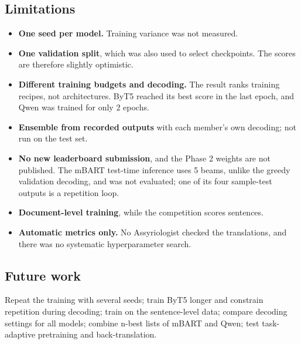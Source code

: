 \documentclass[a4paper,12pt]{article}
\begin{document}
\subsection{Limitations}
\begin{itemize}
    \item \textbf{One seed per model.} Training variance was not measured.
    \item \textbf{One validation split}, which was also used to select checkpoints. The scores are therefore slightly optimistic.
    \item \textbf{Different training budgets and decoding.} The result ranks training recipes, not architectures. ByT5 reached its best score in the last epoch, and Qwen was trained for only 2 epochs.
    \item \textbf{Ensemble from recorded outputs} with each member's own decoding; not run on the test set.
    \item \textbf{No new leaderboard submission}, and the Phase 2 weights are not published. The mBART test-time inference uses 5 beams, unlike the greedy validation decoding, and was not evaluated; one of its four sample-test outputs is a repetition loop.
    \item \textbf{Document-level training}, while the competition scores sentences.
    \item \textbf{Automatic metrics only.} No Assyriologist checked the translations, and there was no systematic hyperparameter search.
\end{itemize}

\subsection{Future work}
Repeat the training with several seeds; train ByT5 longer and constrain repetition during decoding; train on the sentence-level data; compare decoding settings for all models; combine n-best lists of mBART and Qwen; test task-adaptive pretraining and back-translation.
\end{document}
